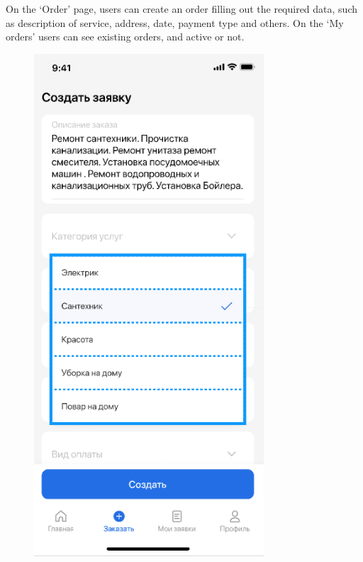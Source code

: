 On the ‘Order’ page, users can create an order filling out the required data, such as description of service, address, date, payment type and others. On the ‘My orders’ users can see existing orders, and active or not.
\begin{figure}[H]
    \centering
    \includegraphics[scale=0.75]{images/func6.png}

\end{figure}
